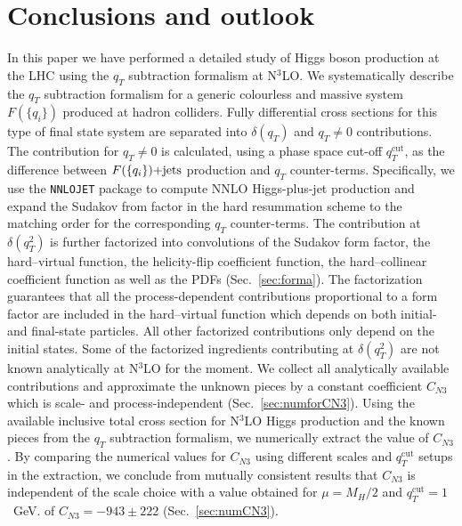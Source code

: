 \documentclass[12pt]{article}
\DeclareRobustCommand{\qt}{q_T}
\DeclareRobustCommand{\qtcut}{\ensuremath{q_T^\mathrm{cut}}}
\begin{document}
\section{Conclusions and outlook}
\label{Sec:conclu}
In this paper we have performed a detailed study of Higgs boson production at the LHC using the $\qt$ subtraction formalism at N$^3$LO. We systematically describe the $\qt$ subtraction formalism for a generic colourless and massive system $F(\{q_i\})$ produced at hadron colliders. Fully differential cross sections for this type of final state system are separated into $\delta(\qt)$ and $\qt\ne 0$ contributions. The contribution for $\qt\ne 0$ is calculated, 
using a phase space cut-off $\qtcut$, as the difference between $F(\{q_i\})\rm{+jets}$ production and $\qt$ counter-terms. Specifically, we use the \texttt{NNLOJET} package to compute NNLO Higgs-plus-jet production and expand the Sudakov from factor in the hard resummation scheme to the matching order for the corresponding $\qt$ counter-terms. The contribution at $\delta(\qt^{2})$ is further factorized into convolutions of the Sudakov form factor, the hard--virtual function, the helicity-flip coefficient function, the hard--collinear coefficient function as well as the PDFs (Sec.~\ref{sec:forma}). The factorization guarantees that all the process-dependent contributions proportional to a form factor are included in the hard--virtual function which depends on both initial- and final-state particles. All other factorized contributions only depend on the initial states. Some of the factorized ingredients contributing at $\delta(\qt^{2})$ are not known analytically at N$^3$LO for the moment. We collect all analytically available contributions and approximate the unknown pieces by a constant coefficient $C_{N3}$ which is scale- and process-independent (Sec.~\ref{sec:numforCN3}). Using the available inclusive total cross section for N$^3$LO Higgs production and the known pieces from  the $\qt$ subtraction formalism, we numerically extract the value of $C_{N3}$. By comparing the numerical values for $C_{N3}$ using different scales and $\qtcut$ setups in the extraction, we conclude from mutually consistent results that $C_{N3}$ is independent of the scale choice with a value obtained for $\mu=M_H/2$ and $\qtcut = 1$~GeV.
of $C_{N3}=-943\pm 222$ (Sec.~\ref{sec:numCN3}).
\end{document}
